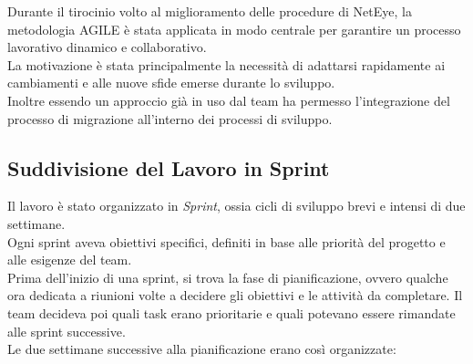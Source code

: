 Durante il tirocinio volto al miglioramento delle procedure di NetEye, la metodologia
AGILE è stata applicata in modo centrale per garantire un processo lavorativo dinamico
e collaborativo.\\ La motivazione è stata principalmente la necessità di adattarsi
rapidamente ai cambiamenti e alle nuove sfide emerse durante lo sviluppo.\\ Inoltre
essendo un approccio già in uso dal team ha permesso l'integrazione del processo
di migrazione all'interno dei processi di sviluppo.

\subsection{Suddivisione del Lavoro in Sprint}
\label{sub:sprint}

Il lavoro è stato organizzato in \textit{Sprint}, ossia cicli di sviluppo brevi
e intensi di due settimane.\\ Ogni sprint aveva obiettivi specifici, definiti in
base alle priorità del progetto e alle esigenze del team.\\ Prima dell'inizio di
una sprint, si trova la fase di pianificazione, ovvero qualche ora dedicata a riunioni
volte a decidere gli obiettivi e le attività da completare. Il team decideva poi
quali task erano prioritarie e quali potevano essere rimandate alle sprint
successive.\\ Le due settimane successive alla pianificazione erano così
organizzate:

